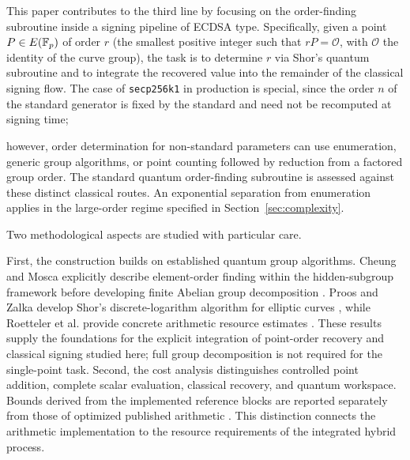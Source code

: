 This paper contributes to the third line by focusing on the order-finding subroutine inside a signing pipeline of ECDSA type. Specifically, given a point $P \in E(\mathbb{F}_p)$ of order $r$ (the smallest positive integer such that $rP = \mathcal{O}$, with $\mathcal{O}$ the identity of the curve group), the task is to determine $r$ via Shor's quantum subroutine and to integrate the recovered value into the remainder of the classical signing flow. The case of \texttt{secp256k1} in production is special, since the order $n$ of the standard generator is fixed by the standard \cite{SEC2_2010} and need not be recomputed at signing time; \begin{revision} however, order determination for non-standard parameters can use enumeration, generic group algorithms, or point counting followed by reduction from a factored group order. 
The standard quantum order-finding subroutine \cite{Shor1997,Kitaev1995,NielsenChuang2010} is assessed against these distinct classical routes. An exponential separation from enumeration applies in the large-order regime specified in Section~\ref{sec:complexity}.
\end{revision} 

Two methodological aspects are studied with particular care. \begin{revision} First, the construction builds on established quantum group algorithms. Cheung and Mosca explicitly describe element-order finding within the hidden-subgroup framework before developing finite Abelian group decomposition \cite{CheungMosca2001}. Proos and Zalka develop Shor's discrete-logarithm algorithm for elliptic curves \cite{ProosZalka2003}, while Roetteler et al. provide concrete arithmetic resource estimates \cite{Roetteler2017}. These results supply the foundations for the explicit integration of point-order recovery and classical signing studied here; full group decomposition is not required for the single-point task. Second, the cost analysis distinguishes controlled point addition, complete scalar evaluation, classical recovery, and quantum workspace. Bounds derived from the implemented reference blocks are reported separately from those of optimized published arithmetic \cite{Roetteler2017,Haner2020}. This distinction connects the arithmetic implementation to the resource requirements of the integrated hybrid process. \end{revision}

